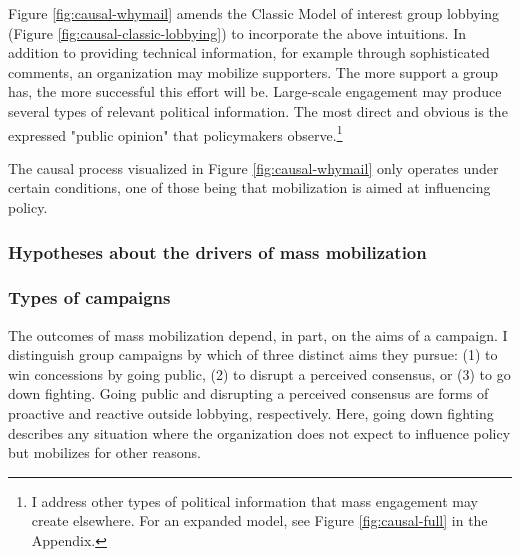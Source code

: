 

Figure \ref{fig:causal-whymail} amends the Classic Model of interest group lobbying (Figure \ref{fig:causal-classic-lobbying}) to incorporate the above intuitions. In addition to providing technical information, for example through sophisticated comments, an organization may mobilize supporters. The more support a group has, the more successful this effort will be. Large-scale engagement may produce several types of relevant political information. The most direct and obvious is the expressed "public opinion" that policymakers observe.\footnote{I address other types of political information that mass engagement may create elsewhere. For an expanded model, see Figure \ref{fig:causal-full} in the Appendix.}

The causal process visualized in Figure \ref{fig:causal-whymail} only operates under certain conditions, one of those being that mobilization is aimed at influencing policy. 




\subsubsection{Hypotheses about the drivers of mass mobilization}

\subsubsection{Types of campaigns} The outcomes of mass mobilization depend, in part, on the aims of a campaign. I distinguish group campaigns by which of three distinct aims they pursue: (1) to win concessions by going public, (2) to disrupt a perceived consensus, or (3) to go down fighting. Going public and disrupting a perceived consensus are forms of proactive and reactive outside lobbying, respectively. Here, going down fighting describes any situation where the organization does not expect to influence policy but mobilizes for other reasons. 

